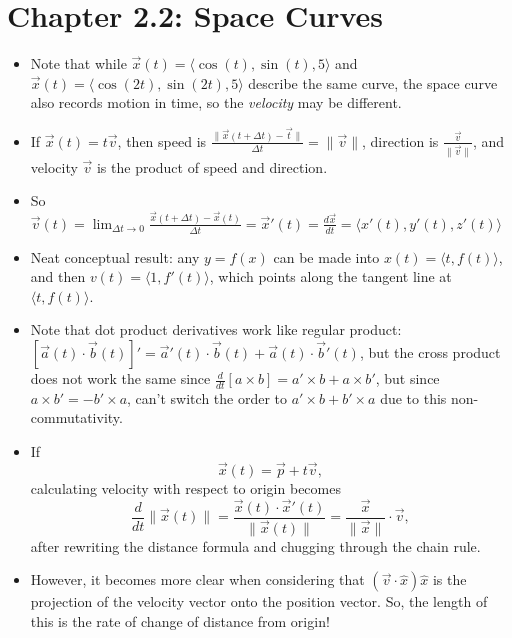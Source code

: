 \documentclass[11pt, oneside]{article}   	%
\begin{document}
\section{Chapter 2.2: Space Curves}
\begin{itemize}
\item Note that while $\vec{x}(t) = \langle \cos(t), \sin(t), 5 \rangle$ and  $\vec{x}(t) = \langle \cos(2t), \sin(2t), 5 \rangle$ describe the same curve, the space curve also records motion in time, so the \emph{velocity} may be different.
\item If $\vec{x}(t) = t\vec{v}$, then speed is $\frac{\| \vec{x}(t+\Delta t) - \vec{t} \|}{\Delta t} = \| \vec{v} \|$,  direction is $\frac{\vec{v}}{\| \vec{v} \|}$, and velocity $\vec{v}$ is the product of speed and direction.
\item So $\vec{v}(t) = \lim_{\Delta t \rightarrow 0} \frac{\vec{x}(t + \Delta t) - \vec{x}(t)}{\Delta t} = \vec{x}'(t) = \frac{d\vec{x}}{dt} = \langle x'(t), y'(t), z'(t) \rangle$
\item Neat conceptual result: any $y = f(x)$ can be made into $x(t) = \langle t, f(t) \rangle$, and then $v(t) = \langle 1, f'(t) \rangle$, which points along the tangent line at $\langle t, f(t)\rangle$.
\item Note that dot product derivatives work like regular product: $[\vec{a}(t) \cdot \vec{b}(t)]' = \vec{a}'(t) \cdot \vec{b}(t) + \vec{a}(t) \cdot \vec{b}'(t)$, 
but the cross product does not work the same since $\frac{d}{dt}[a \times b] = a' \times b + a \times b'$, but since $a \times b' = -b' \times a$, can't switch the order to $a' \times b + b' \times a$ due to this non-commutativity.
\item If $$\vec{x}(t) = \vec{p}+ t \vec{v},$$ calculating velocity with respect to origin  becomes
$$ \frac{d}{dt} \| \vec{x}(t) \| = \frac{\vec{x}(t) \cdot \vec{x}'(t)}{\| \vec{x}(t) \|} = \frac{\vec{x}}{\| \vec{x} \|} \cdot \vec{v},$$ after rewriting the distance formula and chugging through the chain rule.
\item However, it becomes more clear when considering that $(\vec{v} \cdot \hat{x}) \hat{x}$ is the projection of the velocity vector onto the position vector.  So, the length of this is the rate of change of distance from origin!
\end{itemize}
\end{document}

